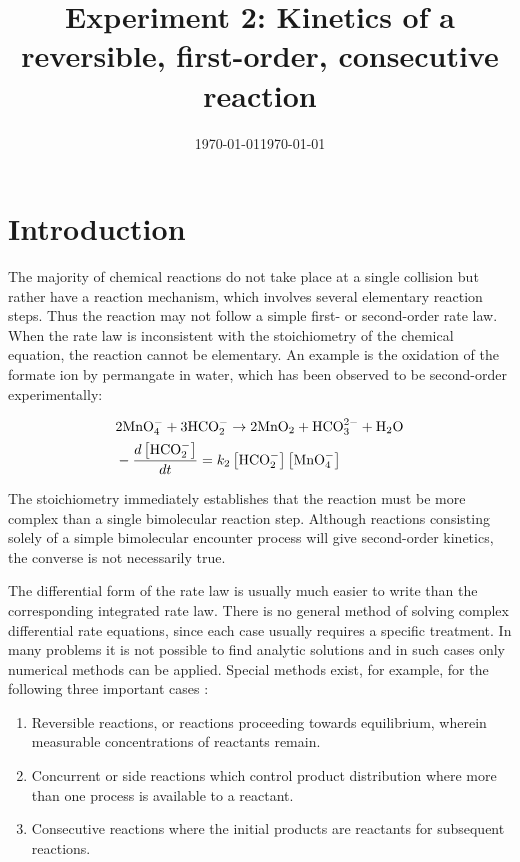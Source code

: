 \documentclass[byrevtex,amssymb,aps,pra,floatfix,letterpaper]{revtex4}
\date{\today}
\begin{document}
\title{Experiment 2: Kinetics of a reversible, first-order, consecutive reaction}

\date{\today}

\maketitle

\section{Introduction}

The majority of chemical reactions do not take place at a single collision but rather have a reaction mechanism, which involves several elementary reaction steps. Thus the reaction may not follow a simple first- or
second-order rate law. When the rate law is inconsistent with the stoichiometry of the chemical equation, the reaction cannot be elementary. An example is the oxidation of the formate ion by permangate in water, which has been observed to be second-order experimentally:

\begin{align}
\label{eq1}
& 2\textnormal{MnO}^-_4 + 3\textnormal{HCO}^-_2 \rightarrow 2\textnormal{MnO}_2 + \textnormal{HCO}^{2-}_3 + \textnormal{H}_2\textnormal{O}\\
\notag
& -\frac{d\left[\textnormal{HCO}^-_2\right]}{dt} = k_2\left[\textnormal{HCO}_2^-\right]\left[\textnormal{MnO}_4^-\right]
\end{align}

\noindent
The stoichiometry immediately establishes that the reaction must be more complex than a single bimolecular reaction step. Although reactions consisting solely of a simple bimolecular encounter process will give second-order kinetics, the converse is not necessarily true.

The differential form of the rate law is usually much easier to write than the corresponding integrated rate law. There is no general method of solving complex differential rate equations, since each case usually requires a specific treatment. In many problems it is not possible to find analytic solutions and in such cases only numerical methods can be applied. Special methods exist, for example, for the following three important cases \cite{ATKINS1,SILBEY,COX}:

\begin{enumerate}
\item Reversible reactions, or reactions proceeding towards equilibrium, wherein measurable concentrations of reactants remain.

\item Concurrent or side reactions which control product distribution where more than one process is available to a reactant.

\item Consecutive reactions where the initial products are reactants for subsequent reactions.
\end{enumerate}
\end{document}
